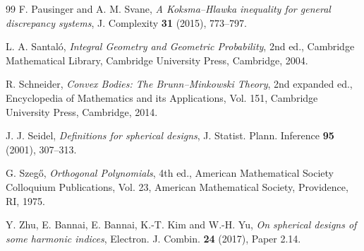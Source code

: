 \documentclass[12pt,a4paper]{article}
\theoremstyle{plain}
\theoremstyle{definition}
\begin{document}
\begin{thebibliography}{99}
F. Pausinger and A. M. Svane,
\emph{A Koksma--Hlawka inequality for general discrepancy systems},
J. Complexity \textbf{31} (2015), 773--797.

L. A. Santal\'o,
\emph{Integral Geometry and Geometric Probability},
2nd ed., Cambridge Mathematical Library,
Cambridge University Press, Cambridge, 2004.

R. Schneider,
\emph{Convex Bodies: The Brunn--Minkowski Theory},
2nd expanded ed., Encyclopedia of Mathematics and its Applications, Vol. 151,
Cambridge University Press, Cambridge, 2014.

J. J. Seidel,
\emph{Definitions for spherical designs},
J. Statist. Plann. Inference \textbf{95} (2001), 307--313.

G. Szeg\H{o},
\emph{Orthogonal Polynomials},
4th ed., American Mathematical Society Colloquium Publications, Vol. 23,
American Mathematical Society, Providence, RI, 1975.

Y. Zhu, E. Bannai, E. Bannai, K.-T. Kim and W.-H. Yu,
\emph{On spherical designs of some harmonic indices},
Electron. J. Combin. \textbf{24} (2017), Paper 2.14.

\end{thebibliography}
\end{document}
